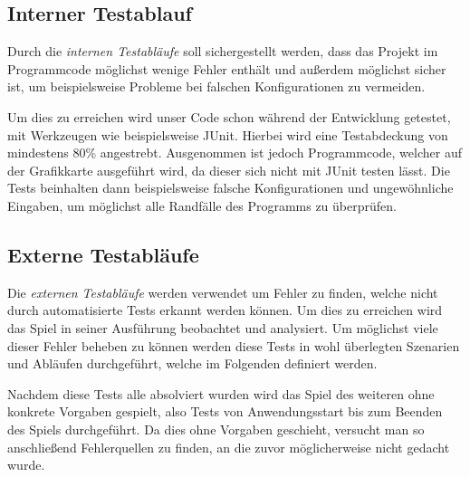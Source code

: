 \documentclass[parskip=full]{scrartcl}
\begin{document}
	\subsection{Interner Testablauf}
	
	Durch die \textit{internen Testabläufe} soll sichergestellt werden, dass das Projekt im Programmcode möglichst wenige Fehler enthält und außerdem möglichst sicher ist,
	um beispielsweise Probleme bei falschen Konfigurationen zu vermeiden.\par
	
	Um dies zu erreichen wird unser Code schon während der Entwicklung getestet, mit Werkzeugen wie beispielsweise \gls{JUnit}. Hierbei wird eine Testabdeckung von mindestens 80\% angestrebt.
	Ausgenommen ist jedoch Programmcode, welcher auf der Grafikkarte ausgeführt wird, da dieser sich nicht mit \gls{JUnit} testen lässt.
	Die Tests beinhalten dann beispielsweise falsche Konfigurationen und ungewöhnliche Eingaben, um möglichst alle Randfälle des Programms zu überprüfen.
	
	
	\subsection{Externe Testabläufe}
	
	Die \textit{externen Testabläufe} werden verwendet um Fehler zu finden, welche nicht durch automatisierte Tests erkannt werden können. Um dies zu erreichen wird das Spiel in seiner Ausführung beobachtet
	und analysiert.
	Um möglichst viele dieser Fehler beheben zu können werden diese Tests in wohl überlegten Szenarien und Abläufen durchgeführt, welche im Folgenden definiert werden.\par
	
	Nachdem diese Tests alle absolviert wurden wird das Spiel des weiteren ohne konkrete Vorgaben gespielt, also Tests von Anwendungsstart bis zum Beenden des Spiels durchgeführt.
	Da dies ohne Vorgaben geschieht, versucht man so anschließend Fehlerquellen zu finden, an die zuvor möglicherweise nicht gedacht wurde.
	
	\pagebreak
	
\end{document}
